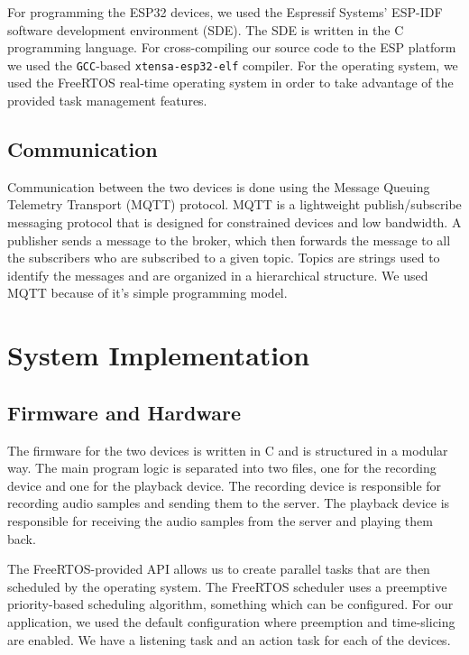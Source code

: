 \documentclass[conference]{IEEEtran}
\begin{document}
For programming the ESP32 devices, we used the Espressif Systems' ESP-IDF\cite{ESP-IDF}
software development environment (SDE). The SDE is written in the C programming 
language. For cross-compiling our source code to the ESP platform we used the \texttt{GCC}-based
\texttt{xtensa-esp32-elf} compiler. 
For the operating system, we used the FreeRTOS\cite{FreeRTOS} real-time operating system
in order to take advantage of the provided task management features.
\subsection{Communication}

Communication between the two devices is done using the Message Queuing Telemetry Transport (MQTT) protocol\cite{MQTT_Survey}.
MQTT is a lightweight publish/subscribe messaging protocol that is designed for constrained devices and low bandwidth.
A publisher sends a message to the broker, which then forwards the message to all the subscribers who are subscribed to a given topic.
Topics are strings used to identify the messages and are organized in a hierarchical structure.
We used MQTT because of it's simple programming model.

\section{System Implementation}
\label{sec:system_implementation}

\subsection{Firmware and Hardware}

The firmware for the two devices is written in C and is structured in a modular way.
The main program logic is separated into two files, one for the recording device and one for the playback device.
The recording device is responsible for recording audio samples and sending them to the server.
The playback device is responsible for receiving the audio samples from the server and playing them back.

The FreeRTOS-provided API allows us to create parallel tasks that are then scheduled by the operating system.
The FreeRTOS scheduler uses a preemptive priority-based scheduling algorithm\cite{FreeRTOS_Scheduling}, something which can be configured.
For our application, we used the default configuration where preemption and time-slicing are enabled.
We have a listening task and an action task for each of the devices.
\end{document}
